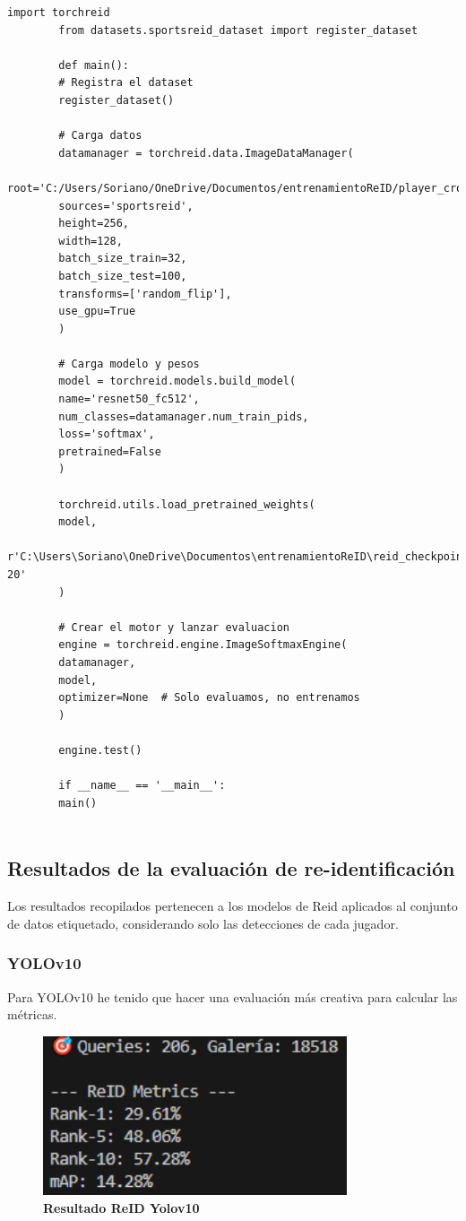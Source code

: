 \documentclass[12pt, a4paper, twoside]{article}
\begin{document}
 	\begin{lstlisting}[style=pythonstyle]
 		import torchreid
 		from datasets.sportsreid_dataset import register_dataset
 		
 		def main():
 		# Registra el dataset
 		register_dataset()
 		
 		# Carga datos
 		datamanager = torchreid.data.ImageDataManager(
 		root='C:/Users/Soriano/OneDrive/Documentos/entrenamientoReID/player_crops2_reid',
 		sources='sportsreid',
 		height=256,
 		width=128,
 		batch_size_train=32,
 		batch_size_test=100,
 		transforms=['random_flip'],
 		use_gpu=True
 		)
 		
 		# Carga modelo y pesos
 		model = torchreid.models.build_model(
 		name='resnet50_fc512',
 		num_classes=datamanager.num_train_pids,
 		loss='softmax',
 		pretrained=False
 		)
 		
 		torchreid.utils.load_pretrained_weights(
 		model,
 		r'C:\Users\Soriano\OneDrive\Documentos\entrenamientoReID\reid_checkpoints\model.resnet50.pth.tar-20'
 		)
 		
 		# Crear el motor y lanzar evaluacion
 		engine = torchreid.engine.ImageSoftmaxEngine(
 		datamanager,
 		model,
 		optimizer=None  # Solo evaluamos, no entrenamos
 		)
 		
 		engine.test()
 		
 		if __name__ == '__main__':
 		main()
 		
 	\end{lstlisting}
 	
 	\subsection{Resultados de la evaluación de re-identificación}
 	
 	Los resultados recopilados pertenecen a los modelos de Reid aplicados al conjunto de datos etiquetado, considerando solo las detecciones de cada jugador. 
 	
 	\subsubsection{YOLOv10}
 	
 	Para YOLOv10 he tenido que hacer una evaluación más creativa para calcular las métricas.
 	
 	\begin{figure}[H]
 		\centering
 		\includegraphics[width=0.8\textwidth]{image/metricas_reid_yolo10}
 		\caption{\textbf{Resultado ReID Yolov10}}
 		\label{fig:Resultado Yolov10 reid}
 	\end{figure}
 	
\end{document}
